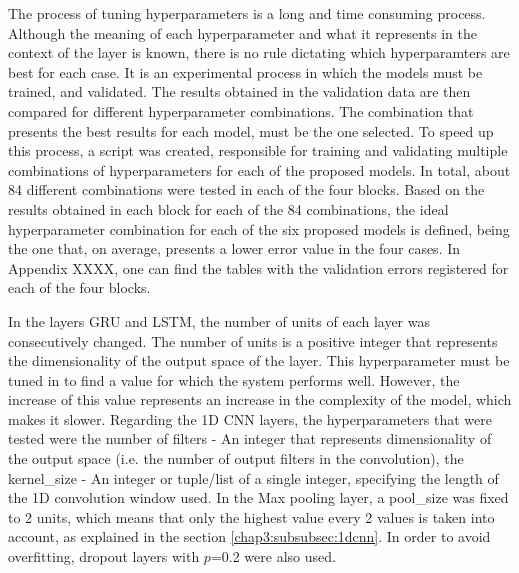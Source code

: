 The process of tuning hyperparameters is a long and time consuming process. Although the meaning of each hyperparameter and what it represents in the context of the layer is known, there is no rule dictating which hyperparamters are best for each case. It is an experimental process in which the models must be trained, and validated. The results obtained in the validation data are then compared for different hyperparameter combinations. The combination that presents the best results for each model, must be the one selected. To speed up this process, a script \cite{} was created, responsible for training and validating multiple combinations of hyperparameters for each of the proposed models. In total, about 84 different combinations were tested in each of the four blocks. Based on the results obtained in each block for each of the 84 combinations, the ideal hyperparameter combination for each of the six proposed models is defined, being the one that, on average, presents a lower error value in the four cases. In Appendix XXXX, one can find the tables with the validation errors registered for each of the four blocks.

In the layers \ac{GRU} and \ac{LSTM}, the number of units of each layer was consecutively changed.
The number of units is a positive integer that represents the dimensionality of the output space of the layer. This hyperparameter must be tuned in to find a value for which the system performs well. However, the increase of this value represents an increase in the complexity of the model, which makes it slower. Regarding the \ac{1D CNN} layers, the hyperparameters that were tested were the number of filters - An integer that represents dimensionality of the output space (i.e. the number of output filters in the convolution), the kernel\_size - An integer or tuple/list of a single integer, specifying the length of the 1D convolution window used. In the Max pooling layer, a pool\_size was fixed to 2 units, which means that only the highest value every 2 values is taken into account, as explained in the section \ref{chap3:subsubsec:1dcnn}. In order to avoid overfitting, dropout layers with $p$=0.2 were also used.


